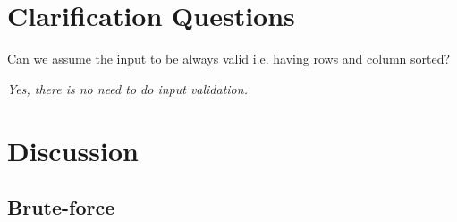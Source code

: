 \section{Clarification Questions}

\begin{QandA}
	\item Can we assume the input to be always valid i.e. having rows and column sorted?
	\begin{answered}
		\textit{Yes, there is no need to do input validation.}
	\end{answered}
	
	
\end{QandA}

\section{Discussion}
\label{kth_smallest_in_sorted_matrix:sec:discussion}


\subsection{Brute-force}
\label{kth_smallest_in_sorted_matrix:sec:bruteforce}

\begin{minipage}{\linewidth}
	
\end{minipage}

